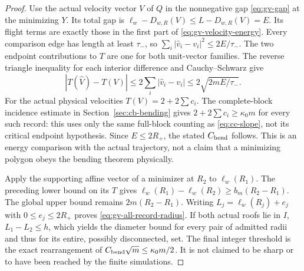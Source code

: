 \begin{proof}
Use the actual velocity vector $V$ of $Q$ in the nonnegative gap
\eqref{eq:gv-gap} at the minimizing $Y$. Its total gap is
$\ell_w-D_{w,R}(V)\le L-D_{w,R}(V)=E$.
Its flight terms are exactly those in the first part of
\eqref{eq:gv-velocity-energy}. Every comparison edge has length at
least $\tau_-$, so
$\sum_i|\widehat v_i-v_i|^2\le2E/\tau_-$.
The two endpoint contributions to $T$ are one for both unit-vector
families. The reverse triangle inequality for each interior difference
and Cauchy--Schwarz give
\[
 |T(\widehat V)-T(V)|
 \le2\sum_i|\widehat v_i-v_i|
 \le2\sqrt{2mE/\tau_-}.
\]
For the actual physical velocities
$T(V)=2+2\sum c_i$. The complete-block incidence estimate in
Section~\ref{sec:cb-bending} gives
$2+2\sum c_i\ge\kappa_0m$ for every such record: this uses only
the same full-block counting as \eqref{eq:cc-slope}, not its critical
endpoint hypothesis. Since $E\le2R_+$, the stated $C_{\rm bend}$ follows.
This is an energy comparison with the actual trajectory, not a claim
that a minimizing polygon obeys the bending theorem physically.

Apply the supporting affine vector of a minimizer at $R_2$ to
$\ell_w(R_1)$. The preceding lower bound on its $T$ gives
$\ell_w(R_1)-\ell_w(R_2)\ge b_m(R_2-R_1)$.
The global upper bound remains $2m(R_2-R_1)$. Writing
$L_j=\ell_w(R_j)+e_j$ with $0\le e_j\le2R_+$ proves
\eqref{eq:gv-all-record-radius}. If both actual roofs lie in $I$,
$L_1-L_2\le h$, which yields the diameter bound for every pair of
admitted radii and thus for its entire, possibly disconnected, set.
The final integer threshold is the exact rearrangement of
$C_{\rm bend}\sqrt m\le\kappa_0m/2$. It is not claimed to be
sharp or to have been reached by the finite simulations.
\end{proof}

